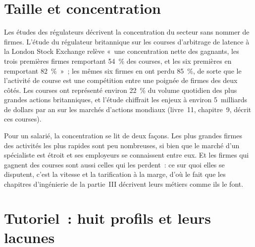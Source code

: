 \section{Taille et concentration}

Les études des régulateurs décrivent la concentration du secteur sans nommer de firmes. L'étude du régulateur britannique
sur les courses d'arbitrage de latence à la London Stock Exchange relève «~une concentration nette des gagnants, les trois premières firmes
remportant 54~\% des courses, et les six premières en remportant 82~\%~»~; les mêmes six firmes en ont perdu 85~\%, de sorte que le
l'activité de course est une compétition entre une poignée de firmes des deux côtés. Les courses ont représenté environ 22~\% du volume quotidien des
plus grandes actions britanniques, et l'étude chiffrait les enjeux à environ 5~milliards de dollars par an sur les marchés d'actions mondiaux
(livre~11, chapitre~9, décrit ces courses).

Pour un salarié, la concentration se lit de deux façons. Les plus grandes firmes des activités les plus rapides sont peu nombreuses, si bien que le
marché d'un spécialiste est étroit et ses employeurs se connaissent entre eux. Et les firmes qui gagnent des courses sont aussi celles qui
les perdent~: ce sur quoi elles se disputent, c'est la vitesse et la tarification à la marge, d'où le fait que les chapitres d'ingénierie
de la partie~III décrivent leurs métiers comme ils le font.

\section{Tutoriel~: huit profils et leurs lacunes}\label{tut:in:proprietary-market-makers-and-high-frequency-firms:tut}

